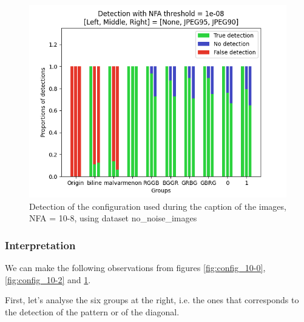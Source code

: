 \documentclass[sigconf, nonacm]{acmart}
\begin{document}
\begin{figure}[p]
    \centering
    \includegraphics[width=0.87\columnwidth]{figures/config_detection_nfa_1e-08.png}
    \caption{Detection of the configuration used during the caption of the images, NFA = 10-8, using dataset no\_noise\_images \cite{colom_noise_2023}}
    \label{fig:config_10-8}
\end{figure}

\subsubsection{Interpretation} We can make the following observations from  figures \ref{fig:config_10-0}, \ref{fig:config_10-2} and \ref{fig:config_10-8}.

\medskip

First, let's analyse the six groups at the right, i.e. the ones that corresponds to the detection of the pattern or of the diagonal.
\end{document}

